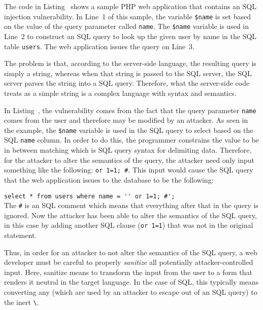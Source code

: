 

The code in Listing~ shows a sample PHP web
application that contains an SQL injection vulnerability. In Line~1 of
this sample, the variable \texttt{\$name} is set based on the value of
the query parameter called \texttt{name}. The \texttt{\$name} variable
is used in Line~2 to construct an SQL query to look up the given user
by name in the SQL table \texttt{users}. The web application issues
the query on Line~3.

The problem is that, according to the server-side language, the
resulting query is simply a string, whereas when that string is passed
to the SQL server, the SQL server parses the string into a SQL query.
Therefore, what the server-side code treats as a simple string is a
complex language with syntax and semantics. 

In Listing~, the vulnerability comes from the
fact that the query parameter \texttt{name} comes from the user and
therefore may be modified by an attacker. As seen in the example, the
\texttt{\$name} variable is used in the SQL query to select based on
the SQL \texttt{name} column. In order to do this, the programmer
constrains the value to be in between matching
\texttt{\textquotesingle} which is SQL query syntax for delimiting
data. Therefore, for the attacker to alter the semantics of the query,
the attacker need only input something like the following:
\texttt{\textquotesingle or 1=1; \#}. This input would cause the
SQL query that the web application issues to the database to be
the following:

\noindent\lstinline!select * from users where name = '' or 1=1; #';!
\\

The \texttt{\#} is an SQL comment which means that everything after
that in the query is ignored. Now the attacker has been able to alter
the semantics of the SQL query, in this case by adding another SQL
clause (\texttt{or 1=1}) that was not in the original statement.

Thus, in order for an attacker to not alter the semantics of the SQL
query, a web developer must be careful to properly \emph{sanitize} all
potentially attacker-controlled input. Here, sanitize means to transform
the input from the user to a form that renders it neutral in the
target language. In the case of SQL, this typically means converting
any \texttt{\textquotesingle} (which are used by an attacker to escape
out of an SQL query) to the inert
\texttt{\textbackslash\textquotesingle}.


